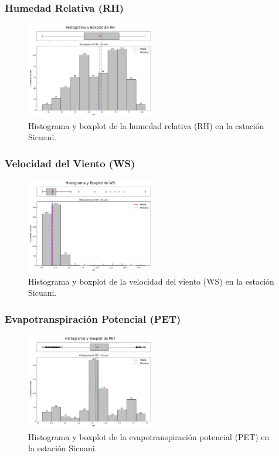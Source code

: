 \subsubsection*{Humedad Relativa (RH)}
\begin{figure}[H]
\centering
\includegraphics[width=0.5\textwidth]{resultados/por_estacion_meteorologica/Sicuani/RH_histograma.png}
\caption{Histograma y boxplot de la humedad relativa (RH) en la estación Sicuani.}
\label{fig:sicuani_RH}
\end{figure}

\subsubsection*{Velocidad del Viento (WS)}
\begin{figure}[H]
\centering
\includegraphics[width=0.5\textwidth]{resultados/por_estacion_meteorologica/Sicuani/WS_histograma.png}
\caption{Histograma y boxplot de la velocidad del viento (WS) en la estación Sicuani.}
\label{fig:sicuani_WS}
\end{figure}

\subsubsection*{Evapotranspiración Potencial (PET)}
\begin{figure}[H]
\centering
\includegraphics[width=0.5\textwidth]{resultados/por_estacion_meteorologica/Sicuani/PET_histograma.png}
\caption{Histograma y boxplot de la evapotranspiración potencial (PET) en la estación Sicuani.}
\label{fig:sicuani_PET}
\end{figure}

